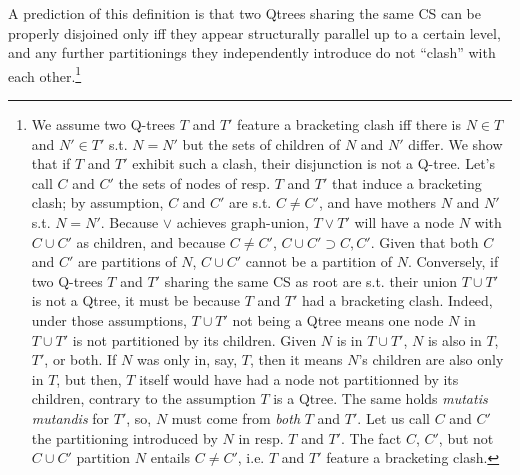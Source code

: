 \begin{exe}
\label{ex2:disj-qtree}
	\end{exe}
	
A prediction of this definition is that two Qtrees sharing the same CS can be properly disjoined only iff they appear structurally parallel up to a certain level, and any further partitionings they independently introduce do not ``clash'' with each other.\footnote{We assume two Q-trees $T$ and $T'$ feature a bracketing clash iff there is $N \in T$ and $N' \in T'$ s.t. $N=N'$ but the sets of children of $N$ and $N'$ differ. We show that if $T$ and $T'$ exhibit such a clash, their disjunction is not a Q-tree. Let's call $C$ and $C'$ the sets of nodes of resp. $T$ and $T'$ that induce a bracketing clash; by assumption, $C$ and $C'$ are s.t. $C\neq C'$, and have mothers $N$ and $N'$ s.t. $N=N'$. Because $\vee$ achieves graph-union, $T\vee T'$ will have a node $N$ with $C\cup C'$ as children, and because $C\neq C'$, $C\cup C' \supset C, C'$. Given that both $C$ and $C'$ are partitions of $N$, $C\cup C'$ cannot be a partition of $N$. Conversely, if two Q-trees $T$ and $T'$ sharing the same CS as root are s.t. their union $T \cup T'$ is not a Qtree, it must be because $T$ and $T'$ had a bracketing clash. Indeed, under those assumptions, $T \cup T'$ not being a Qtree means one node $N$ in $T \cup T'$ is not partitioned by its children. Given $N$ is in $T \cup T'$, $N$ is also in $T$, $T'$, or both. If $N$ was only in, say, $T$, then it means $N$'s children are also only in $T$, but then, $T$ itself would have had a node not partitionned by its children, contrary to the assumption $T$ is a Qtree. The same holds \textit{mutatis mutandis} for $T'$, so, $N$ must come from \textit{both} $T$ and $T'$. Let us call $C$ and $C'$ the partitioning introduced by $N$ in resp. $T$ and $T'$. The fact $C$, $C'$, but not $C \cup C'$ partition $N$ entails $C\neq C'$, i.e. $T$ and $T'$ feature a bracketing clash.}

